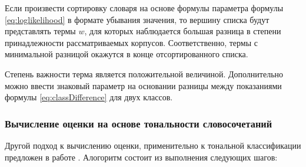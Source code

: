         Если произвести сортировку словаря на основе формулы параметра формулы
        \ref{eq:loglikelihood} в формате убывания значения, то вершину списка
        будут представлять термы $w$, для которых наблюдается большая разница в
        степени принадлежности рассматриваемых корпусов. Соответственно, термы
        с минимальной разницой окажутся в конце отсортированного списка.

        Степень важности терма является положительной величиной. Дополнительно можно
        ввести знаковый параметр на основании разницы между показаниями формулы
        \ref{eq:classDifference} для двух классов.

        \subsubsection{Вычисление оценки на основе тональности словосочетаний}
        Другой подход к вычислению оценки, применительно к тональной классификации
        предложен в работе \cite{lexiconSO}. %
        Алогоритм состоит из выполнения следующих шагов:
